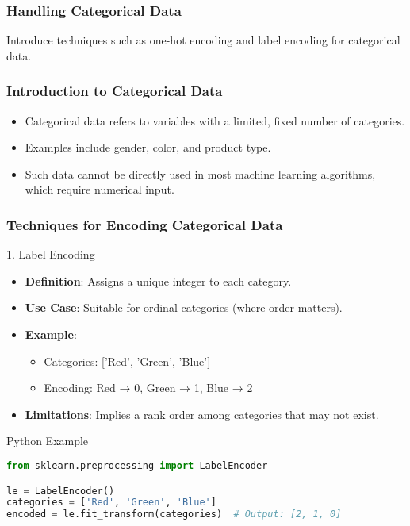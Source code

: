 \documentclass[aspectratio=169]{beamer}
\begin{document}
\begin{frame}[fragile]
    \frametitle{Handling Categorical Data}
    Introduce techniques such as one-hot encoding and label encoding for categorical data.
\end{frame}

\begin{frame}
    \frametitle{Introduction to Categorical Data}
    \begin{itemize}
        \item Categorical data refers to variables with a limited, fixed number of categories.
        \item Examples include gender, color, and product type.
        \item Such data cannot be directly used in most machine learning algorithms, which require numerical input.
    \end{itemize}
\end{frame}

\begin{frame}
    \frametitle{Techniques for Encoding Categorical Data}
    
    \begin{block}{1. Label Encoding}
        \begin{itemize}
            \item \textbf{Definition}: Assigns a unique integer to each category.
            \item \textbf{Use Case}: Suitable for ordinal categories (where order matters).
            \item \textbf{Example}: 
            \begin{itemize}
                \item Categories: ['Red', 'Green', 'Blue']
                \item Encoding: Red → 0, Green → 1, Blue → 2
            \end{itemize}
            \item \textbf{Limitations}: Implies a rank order among categories that may not exist.
        \end{itemize}
    \end{block}
    
    \begin{block}{Python Example}
    \begin{lstlisting}[language=Python]
from sklearn.preprocessing import LabelEncoder

le = LabelEncoder()
categories = ['Red', 'Green', 'Blue']
encoded = le.fit_transform(categories)  # Output: [2, 1, 0]
    \end{lstlisting}
    \end{block}
\end{frame}
\end{document}
